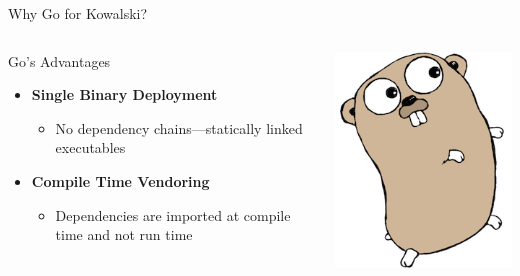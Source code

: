 \documentclass[aspectratio=169]{beamer}
\begin{document}
\begin{frame}{Why Go for Kowalski?}
\begin{columns}
\begin{block}{Go's Advantages}
\begin{itemize}
    \item \textbf{Single Binary Deployment}  
    \begin{itemize}
        \item No dependency chains—statically linked executables  
    \end{itemize}
    \item \textbf{Compile Time Vendoring}  
    \begin{itemize}
        \item Dependencies are imported at compile time and not run time 
    \end{itemize}
\end{itemize}
\end{block}
\includegraphics[width=\linewidth]{gopher}
\end{columns}
\end{frame}
\end{document}
